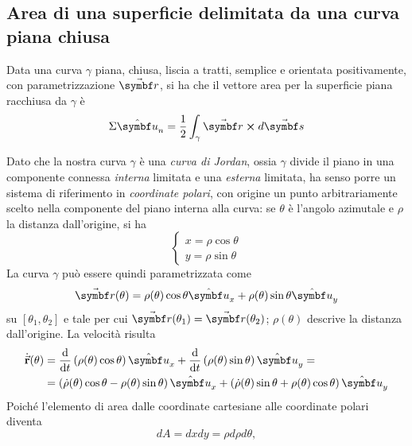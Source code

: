 \subsection{Area di una superficie delimitata da una curva piana chiusa}\label{AreaCurvaDelimitata}
\begin{lemming}
	Data una curva $\gamma$ piana, chiusa, liscia a tratti, semplice e orientata positivamente, con parametrizzazione $\vba{r}$, si ha che il vettore area per la superficie piana racchiusa da $\gamma$ è
	\begin{equation}
		\Sigma\vbh{u}_n=\frac{1}{2}\int_{\gamma}\vba{r}\cross d\vba{s}
	\end{equation}
\end{lemming}
\begin{demonstration}
	Dato che la nostra curva $\gamma$ è una \textit{curva di Jordan}, ossia $\gamma$ divide il piano in una componente connessa \textit{interna} limitata e una \textit{esterna} limitata, ha senso porre un sistema di riferimento in \textit{coordinate polari}, con origine un punto arbitrariamente scelto nella componente del piano interna alla curva: se $\theta$ è l'angolo azimutale e $\rho$ la distanza dall'origine, si ha
	\begin{equation*}
		\begin{cases}
			x=\rho \cos\theta\\
			y=\rho \sin\theta
		\end{cases}
	\end{equation*}
	La curva $\gamma$ può essere quindi parametrizzata come 
	\begin{equation*}
		\vba{r}(\theta)=\rho(\theta)\cos \theta\vbh{u}_x+\rho(\theta)\sin \theta\vbh{u}_y
	\end{equation*}
	su $\left[\theta_1,\theta_2\right]$ e tale per cui $\vba{r}(\theta_1)=\vba{r}(\theta_2)$; $\rho(\theta)$ descrive la distanza dall'origine. La velocità risulta
	\begin{align*}
		\vbd{r}(\theta)&=\dv{t}\left(\rho(\theta)\cos \theta\right)\vbh{u}_x+\dv{t}\left(\rho(\theta)\sin \theta\right)\vbh{u}_y=\\
		&=\left(\dot{\rho}(\theta)\cos \theta-\rho(\theta)\sin \theta\right)\vbh{u}_x+\left(\dot{\rho}(\theta)\sin \theta+\rho(\theta)\cos \theta\right)\vbh{u}_y
	\end{align*}
	Poiché l'elemento di area dalle coordinate cartesiane alle coordinate polari diventa
	\begin{equation*}
		dA=dxdy=\rho d\rho d\theta,

\end{equation*}
\end{demonstration}
